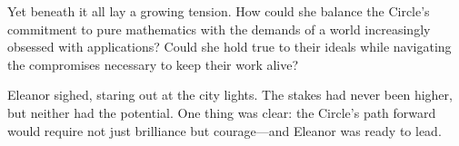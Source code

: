 Yet beneath it all lay a growing tension. How could she balance the Circle’s commitment to pure mathematics with the demands of a world increasingly obsessed with applications? Could she hold true to their ideals while navigating the compromises necessary to keep their work alive?
\bigskip

Eleanor sighed, staring out at the city lights. The stakes had never been higher, but neither had the potential. One thing was clear: the Circle’s path forward would require not just brilliance but courage—and Eleanor was ready to lead.



